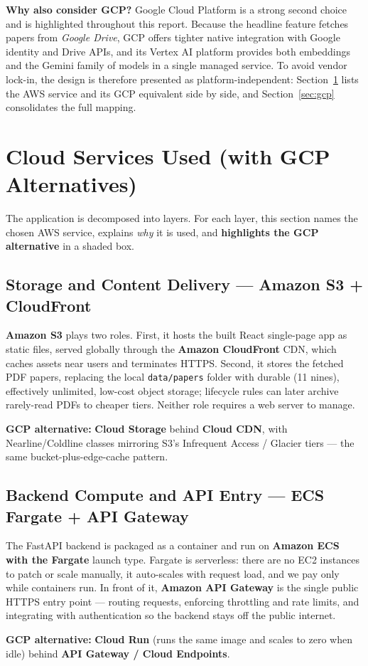 \documentclass[12pt,a4paper]{article}
\begin{document}
\textbf{Why also consider GCP?} Google Cloud Platform is a strong second
choice and is highlighted throughout this report. Because the headline feature
fetches papers from \emph{Google Drive}, GCP offers tighter native integration
with Google identity and Drive APIs, and its Vertex AI platform provides both
embeddings and the Gemini family of models in a single managed service. To
avoid vendor lock-in, the design is therefore presented as
platform-independent: Section~\ref{sec:services} lists the AWS service and its
GCP equivalent side by side, and Section~\ref{sec:gcp} consolidates the full
mapping.

\section{Cloud Services Used (with GCP Alternatives)}
\label{sec:services}

The application is decomposed into layers. For each layer, this section names
the chosen AWS service, explains \emph{why} it is used, and \textbf{highlights
the GCP alternative} in a shaded box.

\subsection{Storage and Content Delivery --- Amazon S3 + CloudFront}
\textbf{Amazon S3} plays two roles. First, it hosts the built React
single-page app as static files, served globally through the
\textbf{Amazon CloudFront} CDN, which caches assets near users and terminates
HTTPS. Second, it stores the fetched PDF papers, replacing the local
\texttt{data/papers} folder with durable (11 nines), effectively unlimited,
low-cost object storage; lifecycle rules can later archive rarely-read PDFs to
cheaper tiers. Neither role requires a web server to manage.
\begin{gcpbox}
\textbf{GCP alternative:} \textbf{Cloud Storage} behind \textbf{Cloud CDN},
with Nearline/Coldline classes mirroring S3's Infrequent Access / Glacier
tiers --- the same bucket-plus-edge-cache pattern.
\end{gcpbox}

\subsection{Backend Compute and API Entry --- ECS Fargate + API Gateway}
The FastAPI backend is packaged as a container and run on \textbf{Amazon ECS
with the Fargate} launch type. Fargate is serverless: there are no EC2
instances to patch or scale manually, it auto-scales with request load, and we
pay only while containers run. In front of it, \textbf{Amazon API Gateway} is
the single public HTTPS entry point --- routing requests, enforcing throttling
and rate limits, and integrating with authentication so the backend stays off
the public internet.
\begin{gcpbox}
\textbf{GCP alternative:} \textbf{Cloud Run} (runs the same image and scales
to zero when idle) behind \textbf{API Gateway / Cloud Endpoints}.
\end{gcpbox}
\end{document}
